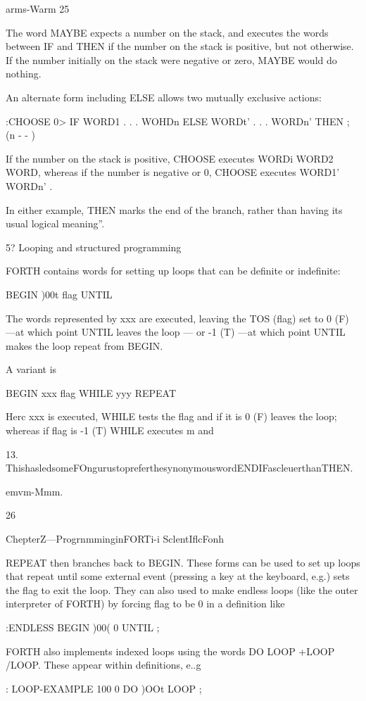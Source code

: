 arms-Warm 25

The word MAYBE expects a number on the stack, and executes
the words between IF and THEN if the number on the stack is
positive, but not otherwise. If the number initially on the stack
were negative or zero, MAYBE would do nothing.

An alternate form including ELSE allows two mutually exclusive
actions:

:CHOOSE 0> IF WORD1 . . . WOHDn
ELSE WORDt' . . . WORDn'
THEN ; (n - - )

If the number on the stack is positive, CHOOSE executes
WORDi WORD2 WORD, whereas if the number is negative
or 0, CHOOSE executes WORD1' WORDn' .

In either example, THEN marks the end of the branch, rather than
having its usual logical meaning”.

5? Looping and structured programming

FORTH contains words for setting up loops that can be deﬁnite
or indeﬁnite:

BEGIN )00t ﬂag UNTIL

The words represented by xxx are executed, leaving the TOS
(ﬂag) set to 0 (F) —at which point UNTIL leaves the loop — or
-1 (T) —at which point UNTIL makes the loop repeat from
BEGIN.

A variant is

BEGIN xxx ﬂag WHILE yyy REPEAT

Herc xxx is executed, WHILE tests the ﬂag and if it is 0 (F) leaves
the loop; whereas if flag is -1 (T) WHILE executes m and

 

13. ThishasledsomeFOngurustopreferthesynonymouswordENDIFascleuerthanTHEN.

emvm-Mmm.

26

ChepterZ—ProgrnmminginFORTi-i SclentIﬂcFonh

REPEAT then branches back to BEGIN. These forms can be used
to set up loops that repeat until some external event (pressing a
key at the keyboard, e.g.) sets the ﬂag to exit the loop. They can
also used to make endless loops (like the outer interpreter of
FORTH) by forcing flag to be 0 in a deﬁnition like

:ENDLESS BEGIN )00( 0 UNTIL ;

FORTH also implements indexed loops using the words DO
LOOP +LOOP /LOOP. These appear within deﬁnitions, e..g

: LOOP-EXAMPLE 100 0 DO )OOt LOOP ;

